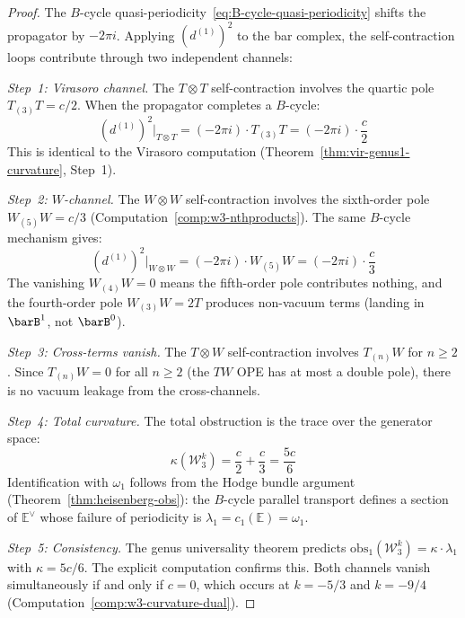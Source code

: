 \begin{proof}
The $B$-cycle quasi-periodicity~\eqref{eq:B-cycle-quasi-periodicity}
shifts the propagator by $-2\pi i$.  Applying $(d^{(1)})^2$ to the
bar complex, the self-contraction loops contribute through two
independent channels:

\emph{Step~1: Virasoro channel.}
The $T \otimes T$ self-contraction involves the quartic pole
$T_{(3)}T = c/2$.  When the propagator completes a $B$-cycle:
\begin{equation}
(d^{(1)})^2\big|_{T \otimes T} = (-2\pi i) \cdot T_{(3)}T
= (-2\pi i) \cdot \frac{c}{2}
\end{equation}
This is identical to the Virasoro computation
(Theorem~\ref{thm:vir-genus1-curvature}, Step~1).

\emph{Step~2: $W$-channel.}
The $W \otimes W$ self-contraction involves the sixth-order pole
$W_{(5)}W = c/3$ (Computation~\ref{comp:w3-nthproducts}).  The
same $B$-cycle mechanism gives:
\begin{equation}
(d^{(1)})^2\big|_{W \otimes W} = (-2\pi i) \cdot W_{(5)}W
= (-2\pi i) \cdot \frac{c}{3}
\end{equation}
The vanishing $W_{(4)}W = 0$ means the fifth-order pole
contributes nothing, and the fourth-order pole $W_{(3)}W = 2T$
produces non-vacuum terms (landing in $\barB^1$, not $\barB^0$).

\emph{Step~3: Cross-terms vanish.}
The $T \otimes W$ self-contraction involves $T_{(n)}W$ for $n \geq 2$.
Since $T_{(n)}W = 0$ for all $n \geq 2$ (the $TW$ OPE has at most a
double pole), there is no vacuum leakage from the cross-channels.

\emph{Step~4: Total curvature.}
The total obstruction is the trace over the generator space:
\begin{equation}
\kappa(\mathcal{W}_3^k) = \frac{c}{2} + \frac{c}{3} = \frac{5c}{6}
\end{equation}
Identification with $\omega_1$ follows from the Hodge bundle argument
(Theorem~\ref{thm:heisenberg-obs}): the $B$-cycle
parallel transport defines a section of $\mathbb{E}^\vee$ whose
failure of periodicity is $\lambda_1 = c_1(\mathbb{E}) = \omega_1$.

\emph{Step~5: Consistency.}
The genus universality theorem predicts
$\mathrm{obs}_1(\mathcal{W}_3^k) = \kappa \cdot \lambda_1$ with
$\kappa = 5c/6$.  The explicit computation confirms this.
Both channels vanish simultaneously if and only if $c = 0$,
which occurs at $k = -5/3$ and $k = -9/4$
(Computation~\ref{comp:w3-curvature-dual}).
\end{proof}

